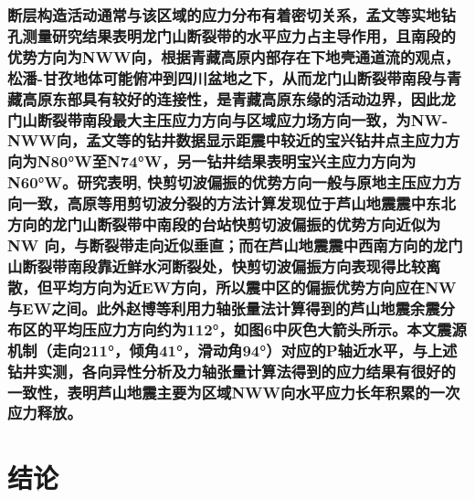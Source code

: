 \documentclass[a4paper,12pt,single,pdftex]{scrartcl}
\begin{document}
\label{ID_1845857375}\subsubsection{断层构造活动通常与该区域的应力分布有着密切关系，孟文等\cite{孟文2013}实地钻孔测量研究结果表明龙门山断裂带的水平应力占主导作用，且南段的优势方向为NWW向，根据青藏高原内部存在下地壳通道流的观点\cite{Royden1997,Clark2000,Meng2005,Burchfiel1995,Harris2007}，松潘-甘孜地体可能俯冲到四川盆地之下\cite{楼海2010}，从而龙门山断裂带南段与青藏高原东部具有较好的连接性，是青藏高原东缘的活动边界，因此龙门山断裂带南段最大主压应力方向与区域应力场方向一致，为NW-NWW向，孟文等的钻井数据显示距震中较近的宝兴钻井点主应力方向为N80°W至N74°W，另一钻井结果表明宝兴主应力方向为N60°W\cite{秦向辉2013}。研究表明, 快剪切波偏振的优势方向一般与原地主压应力方向一致\cite{高原2008,Gao2011,Gao2012}，高原等\cite{高原2013}用剪切波分裂的方法计算发现位于芦山地震震中东北方向的龙门山断裂带中南段的台站快剪切波偏振的优势方向近似为NW 向，与断裂带走向近似垂直；而在芦山地震震中西南方向的龙门山断裂带南段靠近鲜水河断裂处，快剪切波偏振方向表现得比较离散，但平均方向为近EW方向，所以震中区的偏振优势方向应在NW与EW之间。此外赵博等\cite{赵博2013}利用力轴张量法计算得到的芦山地震余震分布区的平均压应力方向约为112°，如图6中灰色大箭头所示。本文震源机制（走向211°，倾角41°，滑动角94°）对应的P轴近水平，与上述钻井实测，各向异性分析及力轴张量计算法得到的应力结果有很好的一致性，表明芦山地震主要为区域NWW向水平应力长年积累的一次应力释放。}

\label{ID_1085563922}\section{结论}


\newpage
\end{document}

